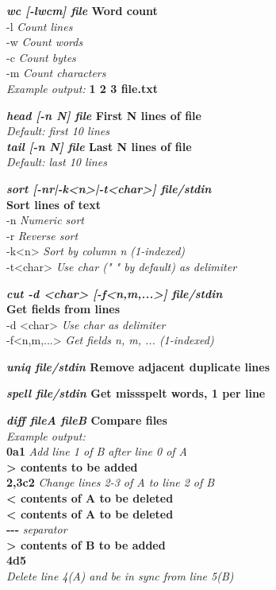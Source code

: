 \textbf{\emph{wc [-lwcm] file} \hfill Word count}\\
\quad -l \hfill \textit{Count lines}\\
\quad -w \hfill \textit{Count words}\\
\quad -c \hfill \textit{Count bytes}\\
\quad -m \hfill \textit{Count characters}\\
\textit{Example output:}
\quad \textbf{  1  2  3 file.txt}

\textbf{\emph{head [-n N] file} \hfill First N lines of file}\\
\quad \textit{Default: first 10 lines}\\
\textbf{\emph{tail [-n N] file} \hfill Last N lines of file}\\
\quad \textit{Default: last 10 lines}

\textbf{\emph{sort [-nr|-k<n>|-t<char>] file/stdin} \\\hfill Sort lines of text}\\
\quad -n \hfill \textit{Numeric sort}\\
\quad -r \hfill \textit{Reverse sort}\\
\quad -k<n> \hfill \textit{Sort by column n (1-indexed)}\\
\quad -t<char> \hfill \textit{Use char (" " by default) as delimiter}

\textbf{\emph{cut -d <char> [-f<n,m,...>] file/stdin} \\\hfill Get fields from lines}\\
\quad -d <char> \hfill \textit{Use char as delimiter}\\
\quad -f<n,m,...> \hfill \textit{Get fields n, m, ... (1-indexed)}

\textbf{\emph{uniq file/stdin} \hfill Remove adjacent duplicate lines}

\textbf{\emph{spell file/stdin} \hfill Get missspelt words, 1 per line}

\textbf{\emph{diff fileA fileB} \hfill Compare files}\\
\textit{Example output:}\\
\quad \textbf{0a1}
\hfill \textit{Add line 1 of B after line 0 of A}\\
\quad \textbf{> contents to be added}\\
\quad \textbf{2,3c2}
\hfill \textit{Change lines 2-3 of A to line 2 of B}\\
\quad \textbf{< contents of A to be deleted}\\
\quad \textbf{< contents of A to be deleted}\\
\quad \textbf{-{}-{}-} \hfill \textit{separator}\\
\quad \textbf{> contents of B to be added}\\
\quad \textbf{4d5}\\
\hfill \textit{Delete line 4(A) and be in sync from line 5(B)}

